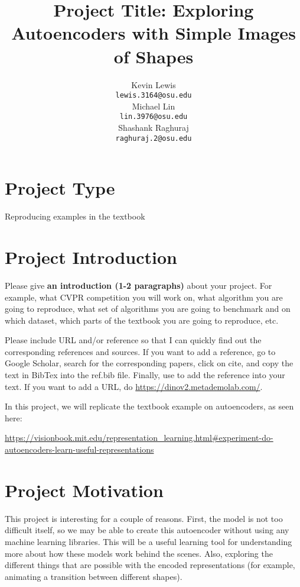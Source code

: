 \documentclass{article}
\title{Project Title: Exploring Autoencoders with Simple Images of Shapes}
\author{%
  Kevin Lewis\\
  \texttt{lewis.3164@osu.edu} \\
  \And
  Michael Lin\\
  \texttt{lin.3976@osu.edu} \\
    \And
  Shashank Raghuraj\\
  \texttt{raghuraj.2@osu.edu} \\
}
\begin{document}
\maketitle



\section{Project Type}
Reproducing examples in the textbook

\section{Project Introduction}
{\color{red}
Please give \textbf{an introduction (1-2 paragraphs)} about your project. For example, what CVPR competition you will work on, what algorithm you are going to reproduce, what set of algorithms you are going to benchmark and on which dataset, which parts of the textbook you are going to reproduce, etc. 


Please include URL and/or reference so that I can quickly find out the corresponding references and sources. If you want to add a reference, go to Google Scholar, search for the corresponding papers, click on cite, and copy the text in BibTex into the ref.bib file. Finally, use \cite{oquab2023dinov2} to add the reference into your text. 
If you want to add a URL, do \url{https://dinov2.metademolab.com/}.

} 

In this project, we will replicate the textbook example on autoencoders, as seen here: 

\url{https://visionbook.mit.edu/representation_learning.html#experiment-do-autoencoders-learn-useful-representations}



\section{Project Motivation}

This project is interesting for a couple of reasons. First, the model is not too difficult itself, so we may be able to create this autoencoder without using any machine learning libraries.  This will be a useful learning tool for understanding more about how these models work behind the scenes.  Also, exploring the different things that are possible with the encoded representations (for example, animating a transition between different shapes).
\end{document}
